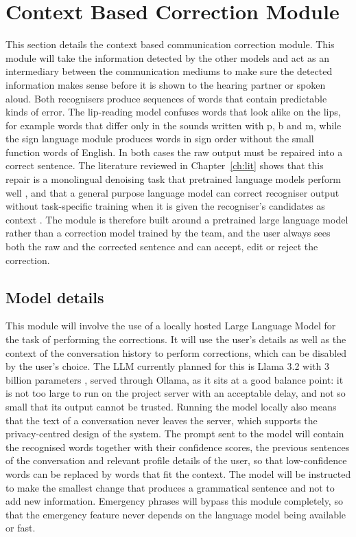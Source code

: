 \documentclass{FastFyp}
\begin{document}
\section{Context Based Correction Module}
This section details the context based communication correction module. This module will take the information detected by the other models and act as an intermediary between the communication mediums to make sure the detected information makes sense before it is shown to the hearing partner or spoken aloud. Both recognisers produce sequences of words that contain predictable kinds of error. The lip-reading model confuses words that look alike on the lips, for example words that differ only in the sounds written with p, b and m, while the sign language module produces words in sign order without the small function words of English. In both cases the raw output must be repaired into a correct sentence. The literature reviewed in Chapter~\ref{ch:lit} shows that this repair is a monolingual denoising task that pretrained language models perform well \cite{ref:Chen:2026}, and that a general purpose language model can correct recogniser output without task-specific training when it is given the recogniser's candidates as context \cite{ma2025llmasr}. The module is therefore built around a pretrained large language model rather than a correction model trained by the team, and the user always sees both the raw and the corrected sentence and can accept, edit or reject the correction.

\subsection{Model details}
This module will involve the use of a locally hosted Large Language Model for the task of performing the corrections. It will use the user's details as well as the context of the conversation history to perform corrections, which can be disabled by the user's choice. The LLM currently planned for this is Llama 3.2 with 3 billion parameters \cite{ollama_llama32_3b}, served through Ollama, as it sits at a good balance point: it is not too large to run on the project server with an acceptable delay, and not so small that its output cannot be trusted. Running the model locally also means that the text of a conversation never leaves the server, which supports the privacy-centred design of the system. The prompt sent to the model will contain the recognised words together with their confidence scores, the previous sentences of the conversation and relevant profile details of the user, so that low-confidence words can be replaced by words that fit the context. The model will be instructed to make the smallest change that produces a grammatical sentence and not to add new information. Emergency phrases will bypass this module completely, so that the emergency feature never depends on the language model being available or fast.
\end{document}
